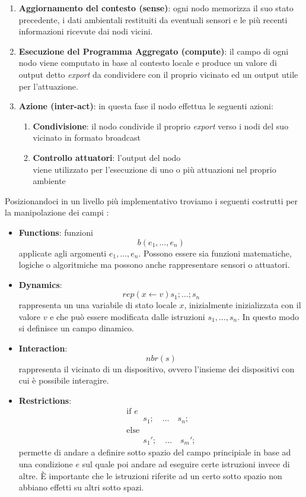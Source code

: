\documentclass[12pt,a4paper,openright,twoside]{book}
\begin{document}
\begin{enumerate}
    \item \textbf{Aggiornamento del contesto (sense)}: ogni nodo memorizza il suo stato precedente, i dati ambientali restituiti da eventuali sensori e le più recenti informazioni ricevute dai nodi vicini.
    \item \textbf{Esecuzione del Programma Aggregato (compute)}: il campo di ogni nodo viene computato in base al contesto locale e produce un valore di output detto \textit{export} da condividere con il proprio vicinato ed un output utile per l'attuazione.
    \item \textbf{Azione (inter-act)}: in questa fase il nodo effettua le seguenti azioni:
    \begin{enumerate}
        \item \textbf{Condivisione}: il nodo condivide il proprio \textit{export} verso i nodi del suo vicinato in formato broadcast
        \item \textbf{Controllo attuatori}: l'output del nodo \\ viene 
        utilizzato per l'esecuzione di uno o più attuazioni nel proprio ambiente
    \end{enumerate}
\end{enumerate}

Posizionandoci in un livello più implementativo troviamo i seguenti costrutti per la manipolazione dei campi \cite{Pianini2017}: 

\begin{itemize}
    \item \textbf{Functions}: funzioni $$ b(e_1,\dots,e_n) $$ applicate agli argomenti $e_1,\dots,e_n$. Possono essere sia funzioni matematiche, logiche o algoritmiche ma possono anche rappresentare sensori o attuatori.
    \item \textbf{Dynamics}: $$ rep(x \leftarrow v){s_1;\dots;s_n} $$ rappresenta un una variabile di stato locale $x$, inizialmente inizializzata con il valore $v$ e che può essere modificata dalle istruzioni $s_1,\dots,s_n$. In questo modo si definisce un campo dinamico.
    \item \textbf{Interaction}: $$ nbr(s) $$ rappresenta il vicinato di un dispositivo, ovvero l'insieme dei dispositivi con cui è possibile interagire.
    \item \textbf{Restrictions}: $$
        \begin{array}{l}
        \text{if } e \\
        \qquad s_1; \quad \dots \quad s_n; \\
        \text{else} \\
        \qquad s_1'; \quad \dots \quad s_m';
        \end{array}
    $$
    permette di andare a definire sotto spazio del campo principiale in base ad una condizione $e$ sul quale poi andare ad eseguire certe istruzioni invece di altre. È importante che le istruzioni riferite ad un certo sotto spazio non abbiano effetti su altri sotto spazi.
\end{itemize}
\end{document}

